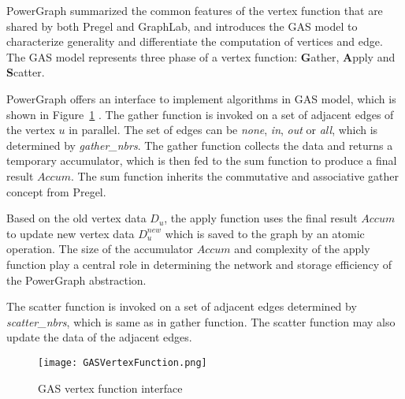 PowerGraph summarized the common features of the vertex function that are shared by both Pregel and GraphLab, and introduces the GAS model to characterize generality and differentiate the computation of vertices and edge. The GAS model represents three phase of a vertex function: \textbf{G}ather, \textbf{A}pply and \textbf{S}catter. 

PowerGraph offers an interface to implement algorithms in GAS model, which is shown in Figure~\ref{fig:GASVertexFunction} \cite{gonzalez2012powergraph}. The gather function is invoked on a set of adjacent edges of the vertex $u$ in parallel. The set of edges can be \emph{none}, \textit{in}, \textit{out} or \textit{all}, which is determined by \textit{gather\_nbrs}. The gather function collects the data and returns a temporary accumulator, which is then fed to the sum function to produce a final result $Accum$. The sum function inherits the commutative and associative gather concept from Pregel.

Based on the old vertex data $D_u$, the apply function uses the final result $Accum$ to update new vertex data $D^{new}_u$ which is saved to the graph by an atomic operation. The size of the accumulator $Accum$ and complexity of the apply function play a central role in determining the network and storage efficiency of the PowerGraph abstraction.
 
The scatter function is invoked on a set of adjacent edges determined by \textit{scatter\_nbrs}, which is same as in gather function. The scatter function may also update the data of the adjacent edges.

\begin{figure}
  \begin{center}
    \texttt{[image: GASVertexFunction.png]}
    \caption{GAS vertex function interface}
    \label{fig:GASVertexFunction}
  \end{center}
\end{figure}






